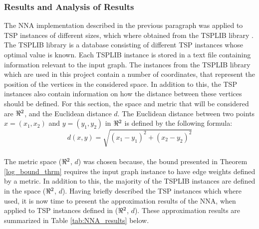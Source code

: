\documentclass{article}
\begin{document}
\subsubsection{Results and Analysis of Results}
\label{NNA_analyze}
The NNA implementation described in the previous paragraph was applied to TSP instances of different sizes, which where obtained from the TSPLIB library \cite{reinelt}. The TSPLIB library is a database consisting of different TSP instances whose optimal value is known. Each TSPLIB instance is stored in a text file containing information relevant to the input graph. The instances from the TSPLIB library which are used in this project contain a number of coordinates, that represent the position of the vertices in the considered space. In addition to this, the TSP instances also contain information on how the distance between these vertices should be defined. For this section, the space and metric that will be considered are $\real^2$, and the Euclidean distance $d$. The Euclidean distance between two points $x=(x_1, x_2)$ and $y=(y_1, y_2)$ in $\real^2$ is defined by the following formula: \\
\begin{equation}
  \label{metric_space}
  d(x,y) = \sqrt{(x_1-y_1)^2+(x_2-y_2)^2}
\end{equation}\\
The metric space ($\real^2$, $d$) was chosen because, the bound presented in Theorem \ref{log_bound_thrm} requires the input graph instance to have edge weights defined by a metric. In addition to this, the majority of the TSPLIB instances are defined in the space ($\real^2$, $d$). Having briefly described the TSP instances which where used, it is now time to present the approximation results of the NNA, when applied to TSP instances defined in ($\real^2$, $d$). These approximation results are summarized in Table \ref{tab:NNA_results} below.
\end{document}

